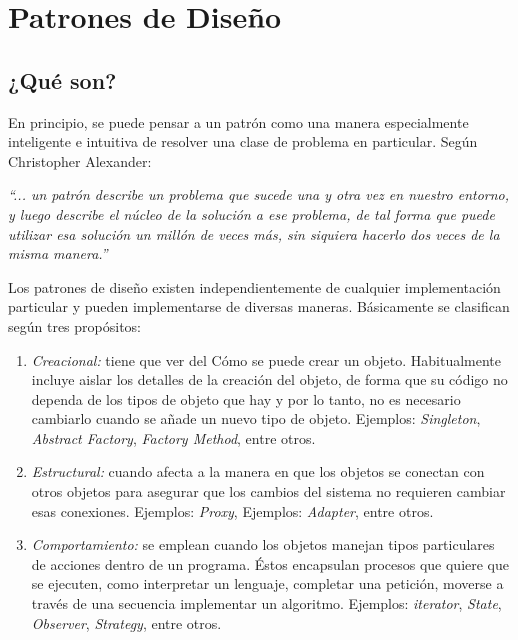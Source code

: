 \chapter{Patrones de Diseño}
\label{patrones}

\section{¿Qué son?}

En principio, se puede pensar a un patrón como una manera especialmente inteligente e intuitiva de resolver una clase de problema en particular. Según Christopher Alexander:

\begin{center}
\emph{``... un patrón describe un problema que sucede una y otra vez en nuestro entorno, y luego describe el núcleo de la solución a ese problema, de tal forma que puede utilizar esa solución un millón de veces más, sin siquiera hacerlo dos veces de la misma manera.''}
\end{center}

Los patrones de diseño\cite{Gamma95} existen independientemente de cualquier implementación particular y pueden implementarse de diversas maneras. Básicamente se clasifican según tres propósitos:
\begin{enumerate}
	\item \emph{Creacional:} tiene que ver del Cómo se puede crear un objeto. Habitualmente incluye aislar los detalles de la creación
							 del objeto, de forma que su código no dependa de los tipos de objeto que hay y por lo tanto, no es
							 necesario cambiarlo cuando se añade un nuevo tipo de objeto. Ejemplos: \emph{Singleton}, \emph{Abstract
							 Factory}, \emph{Factory Method}, entre otros.

	\item \emph{Estructural:} cuando afecta a la manera en que los objetos se conectan con otros objetos para asegurar que los cambios
							 del sistema no requieren cambiar esas conexiones. Ejemplos: \emph{Proxy}, Ejemplos: \emph{Adapter}, entre
							 otros.

	\item \emph{Comportamiento:} se emplean cuando los objetos manejan tipos particulares de acciones dentro de un programa. Éstos encapsulan procesos que quiere que se ejecuten, como interpretar un lenguaje, completar una petición, moverse a través de una secuencia  implementar un algoritmo. Ejemplos: \emph{iterator}, \emph{State}, \emph{Observer}, \emph{Strategy}, entre otros.
\end{enumerate}

